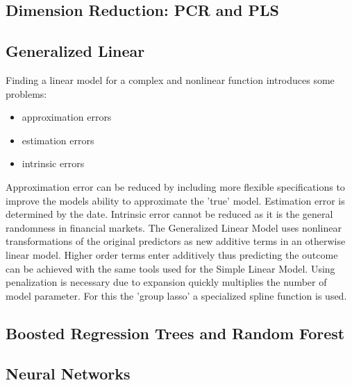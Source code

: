 \documentclass{article}
\begin{document}
\subsection{Dimension Reduction: PCR and PLS}
\subsection{Generalized Linear}
	Finding a linear model for a complex and nonlinear function introduces some problems:
	\begin{itemize}
		\item approximation errors
		\item estimation errors
		\item intrinsic errors
	\end{itemize}
	Approximation error can be reduced by including more flexible specifications to improve the 
	models ability to approximate the 'true' model.
	Estimation error is determined by the date.
	Intrinsic error cannot be reduced as it is the general randomness in financial markets.
	The Generalized Linear Model uses nonlinear transformations of the original predictors as new
	additive terms in an otherwise linear model.
	Higher order terms enter additively thus predicting the outcome can be achieved with the same
	tools used for the Simple Linear Model.
	Using penalization is necessary due to expansion quickly multiplies the number of model parameter.
	For this the 'group lasso' a specialized spline function is used.
	
\subsection{Boosted Regression Trees and Random Forest}
\subsection{Neural Networks}
\end{document}
